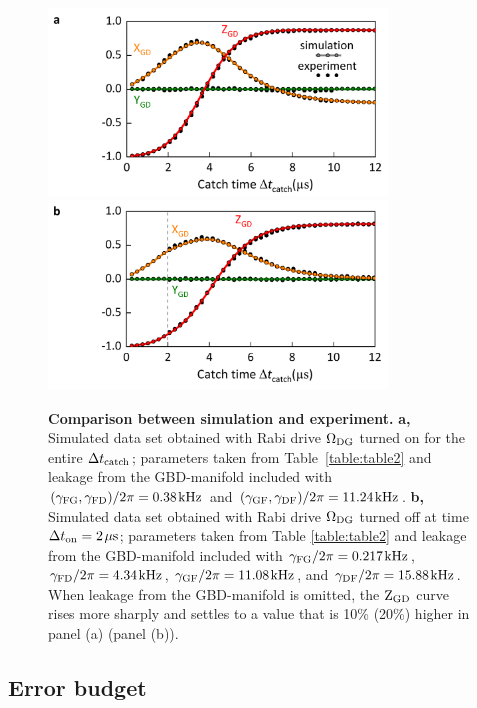 \documentclass[
						superscriptaddress, 																 amsmath, amssymb,
		 aps,  prb,  
										floatfix,
		linenumbers,
			]{revtex4-1}
\begin{document}
\begin{figure}[t]
\begin{centering}
\hskip-1.75cm\includegraphics[width=9cm]{figure1.pdf}\hskip1cm
\vskip0.5cm
\hskip-1.75cm\includegraphics[width=9cm]{figure2.pdf}
\caption{\label{fig:simulation_vs_experiment}
\textbf{Comparison between simulation and experiment.} 
\textbf{a,}
 Simulated data set obtained with Rabi drive $\Omega_{\rm DG}$ turned on for the entire $\Delta t_{\rm catch}$; parameters taken from Table~\ref{table:table2} and leakage from the GBD-manifold included with $(\gamma_{\rm FG},\gamma_{\rm FD})/2\pi=0.38\mkern2mu{\rm kHz}$ and $(\gamma_{\rm GF},\gamma_{\rm DF})/2\pi=11.24\mkern2mu{\rm kHz}$. \textbf{b,} 
Simulated data set obtained with Rabi drive $\Omega_{\rm DG}$ turned off at time $\Delta t_{\rm on}=2\mkern2mu\mu{\rm s}$; parameters taken from Table \ref{table:table2} and leakage from the GBD-manifold included with $\gamma_{\rm FG}/2\pi=0.217\mkern2mu{\rm kHz}$, $\gamma_{\rm FD}/2\pi=4.34\mkern2mu{\rm kHz}$, $\gamma_{\rm GF}/2\pi=11.08\mkern2mu{\rm kHz}$, and $\gamma_{\rm DF}/2\pi=15.88\mkern2mu{\rm kHz}$. When leakage from the GBD-manifold is omitted, the ${\rm Z}_{\rm GD}$ curve rises more sharply and settles to a value that is  10\% (20\%) higher in panel (a) (panel (b)).
}
\end{centering}
\end{figure}





\subsection{Error budget}
\label{sec:Error-budget}
\end{document}
